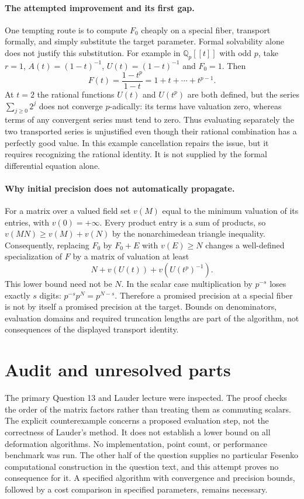\documentclass[11pt]{article}
\begin{document}
\paragraph{The attempted improvement and its first gap.}
One tempting route is to compute $F_0$ cheaply on a special fiber,
transport formally, and simply substitute the target parameter.
Formal solvability alone does not justify this substitution. For
example in $\mathbb Q_p[[t]]$ with odd $p$, take $r=1$,
$A(t)=(1-t)^{-1}$, $U(t)=(1-t)^{-1}$ and $F_0=1$.
Then
\[
F(t)=\frac{1-t^p}{1-t}=1+t+\cdots+t^{p-1}.
\]
At $t=2$ the rational functions $U(t)$ and $U(t^p)$ are both
defined, but the series $\sum_{j\ge0}2^j$ does not converge
$p$-adically: its terms have valuation zero, whereas terms of any
convergent series must tend to zero. Thus evaluating separately the
two transported series is unjustified even though their rational
combination has a perfectly good value. In this example cancellation
repairs the issue, but it requires recognizing the rational identity.
It is not supplied by the formal differential equation alone.

\paragraph{Why initial precision does not automatically propagate.}
For a matrix over a valued field set $v(M)$ equal to the minimum
valuation of its entries, with $v(0)=+\infty$. Every product entry
is a sum of products, so $v(MN)\ge v(M)+v(N)$ by the
nonarchimedean triangle inequality. Consequently, replacing $F_0$ by
$F_0+E$ with $v(E)\ge N$ changes a well-defined specialization of
$F$ by a matrix of valuation at least
\[
N+v(U(t))+v(U(t^p)^{-1}).
\]
This lower bound need not be $N$. In the scalar case multiplication
by $p^{-s}$ loses exactly $s$ digits: $p^{-s}p^N=p^{N-s}$.
Therefore a promised precision at a special fiber is not by itself
a promised precision at the target. Bounds on denominators, evaluation
domains and required truncation lengths are part of the algorithm,
not consequences of the displayed transport identity.

\section{Audit and unresolved parts}
The primary Question 13 and Lauder lecture were inspected. The proof
checks the order of the matrix factors rather than treating them as
commuting scalars. The explicit counterexample concerns a proposed
evaluation step, not the correctness of Lauder's method. It does not
establish a lower bound on all deformation algorithms. No implementation,
point count, or performance benchmark was run. The other half of the
question supplies no particular Fesenko computational construction in
the question text, and this attempt proves no consequence for it.
A specified algorithm with convergence and precision bounds, followed
by a cost comparison in specified parameters, remains necessary.
\end{document}
